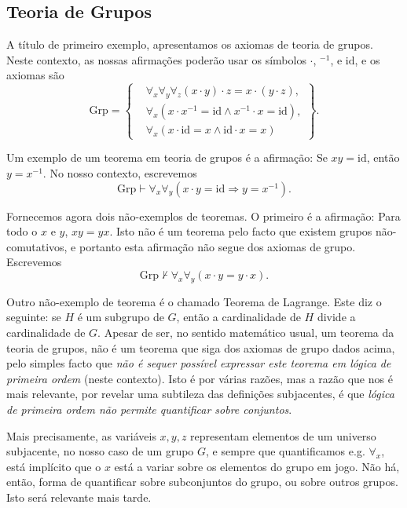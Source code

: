 \subsection*{Teoria de Grupos}

A título de primeiro exemplo, apresentamos os axiomas de teoria de grupos. Neste contexto, as nossas afirmações poderão usar os símbolos $\cdot$, ${}^{-1}$, e $\mathrm{id}$, e os axiomas são
\begin{equation}
\mathrm{Grp} = \left\{
\begin{aligned}
&\forall_x \forall_y \forall_z (x \cdot y) \cdot z = x \cdot (y \cdot z),\\
&\forall_x (x \cdot x^{-1} = \mathrm{id} \land x^{-1} \cdot x = \mathrm{id}),\\
&\forall_x (x \cdot \mathrm{id} = x \land \mathrm{id} \cdot x = x)
\end{aligned}
\right\}.
\end{equation}

Um exemplo de um teorema em teoria de grupos é a afirmação: Se $xy = \mathrm{id}$, então $y = x^{-1}$. No nosso contexto, escrevemos
\begin{equation}
\mathrm{Grp} \vdash \forall_x \forall_y (x \cdot y = \mathrm{id} \Rightarrow y = x^{-1}).
\end{equation}

Fornecemos agora dois não-exemplos de teoremas. O primeiro é a afirmação: Para todo o $x$ e $y$, $xy = yx$. Isto não é um teorema pelo facto que existem grupos não-comutativos, e portanto esta afirmação não segue dos axiomas de grupo. Escrevemos
\begin{equation}
\mathrm{Grp} \nvdash \forall_x \forall_y (x\cdot y = y\cdot x).
\end{equation}

Outro não-exemplo de teorema é o chamado Teorema de Lagrange. Este diz o seguinte: se $H$ é um subgrupo de $G$, então a cardinalidade de $H$ divide a cardinalidade de $G$. Apesar de ser, no sentido matemático usual, um teorema da teoria de grupos, não é um teorema que siga dos axiomas de grupo dados acima, pelo simples facto que \emph{não é sequer possível expressar este teorema em lógica de primeira ordem} (neste contexto). Isto é por várias razões, mas a razão que nos é mais relevante, por revelar uma subtileza das definições subjacentes, é que \emph{lógica de primeira ordem não permite quantificar sobre conjuntos}.

Mais precisamente, as variáveis $x, y, z$ representam elementos de um universo subjacente, no nosso caso de um grupo $G$, e sempre que quantificamos e.g. $\forall_x$, está implícito que o $x$ está a variar sobre os elementos do grupo em jogo. Não há, então, forma de quantificar sobre subconjuntos do grupo, ou sobre outros grupos. Isto será relevante mais tarde.

